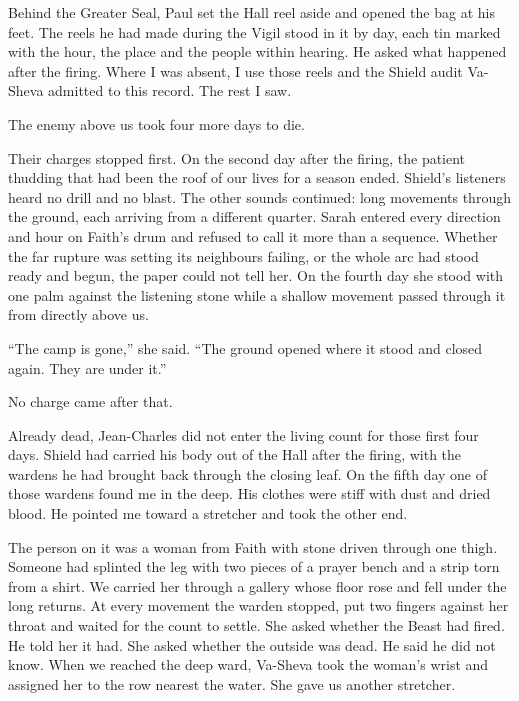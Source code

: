 
Behind the Greater Seal, Paul set the Hall reel aside and opened the bag at his feet. The reels he had made during the Vigil stood in it by day, each tin marked with the hour, the place and the people within hearing. He asked what happened after the firing. Where I was absent, I use those reels and the Shield audit Va-Sheva admitted to this record. The rest I saw.\par

The enemy above us took four more days to die.\par

Their charges stopped first. On the second day after the firing, the patient thudding that had been the roof of our lives for a season ended. Shield's listeners heard no drill and no blast. The other sounds continued: long movements through the ground, each arriving from a different quarter. Sarah entered every direction and hour on Faith's drum and refused to call it more than a sequence. Whether the far rupture was setting its neighbours failing, or the whole arc had stood ready and begun, the paper could not tell her. On the fourth day she stood with one palm against the listening stone while a shallow movement passed through it from directly above us.\par

``The camp is gone,'' she said. ``The ground opened where it stood and closed again. They are under it.''\par

No charge came after that.\par

Already dead, Jean-Charles did not enter the living count for those first four days. Shield had carried his body out of the Hall after the firing, with the wardens he had brought back through the closing leaf. On the fifth day one of those wardens found me in the deep. His clothes were stiff with dust and dried blood. He pointed me toward a stretcher and took the other end.\par

The person on it was a woman from Faith with stone driven through one thigh. Someone had splinted the leg with two pieces of a prayer bench and a strip torn from a shirt. We carried her through a gallery whose floor rose and fell under the long returns. At every movement the warden stopped, put two fingers against her throat and waited for the count to settle. She asked whether the Beast had fired. He told her it had. She asked whether the outside was dead. He said he did not know. When we reached the deep ward, Va-Sheva took the woman's wrist and assigned her to the row nearest the water. She gave us another stretcher.\par

